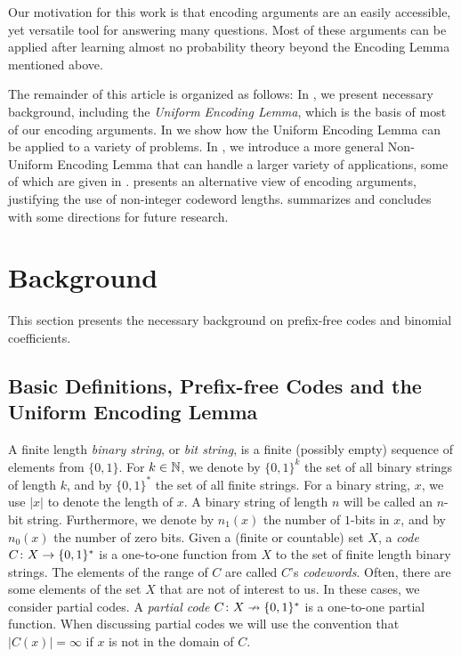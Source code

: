 \documentclass{patmorin}
\begin{document}
Our motivation for this work is that encoding arguments are an easily
accessible, yet versatile tool for answering many questions.  Most of
these arguments can be applied after learning almost no probability
theory beyond the Encoding Lemma mentioned above.

The remainder of this article is organized as follows: In
, we present necessary background, including the
\emph{Uniform Encoding Lemma}, which is the basis of most of our
encoding arguments. In  we show how the Uniform
Encoding Lemma can be applied to a variety of problems. In
, we introduce a more general Non-Uniform Encoding Lemma
that can handle a larger variety of applications, some of which are
given in .   presents an
alternative view of encoding arguments, justifying the use of
non-integer codeword lengths.   summarizes and
concludes with some directions for future research.

\section{Background}

This section presents the necessary background on prefix-free codes
and binomial coefficients.

\subsection{Basic Definitions, Prefix-free Codes and the Uniform 
Encoding Lemma}

A finite length \emph{binary string}, or \emph{bit string}, is a
finite (possibly empty) sequence of elements from $\{0, 1\}$. For
$k \in \mathbb{N}$, we denote by $\{0, 1\}^k$ the set of all binary strings of
length $k$, and by $\{0,1\}^*$ the set of all finite strings.
For a binary string, $x$, we use $|x|$ to denote the length of $x$.  A
binary string of length $n$ will be called an $n$-bit string. 
Furthermore, we denote by $n_1(x)$ the number of $1$-bits in
$x$, and by $n_0(x)$ the number of zero bits.
Given a (finite or countable) set $X$, a
\emph{code} $C\colon X\to \{0,1\}^*$ is a one-to-one function from 
$X$ to the set of finite length binary strings.  The elements of
the range of $C$ are called $C$'s
\emph{codewords}. Often, there are some
elements of the set $X$ that are not of interest to us.  In these
cases, we consider partial codes. A \emph{partial code}
$C\colon X\nrightarrow \{0,1\}^*$ is a one-to-one partial function.
When discussing partial codes we will use the convention that
$|C(x)|=\infty$ if $x$ is not in the domain of $C$.
\end{document}
